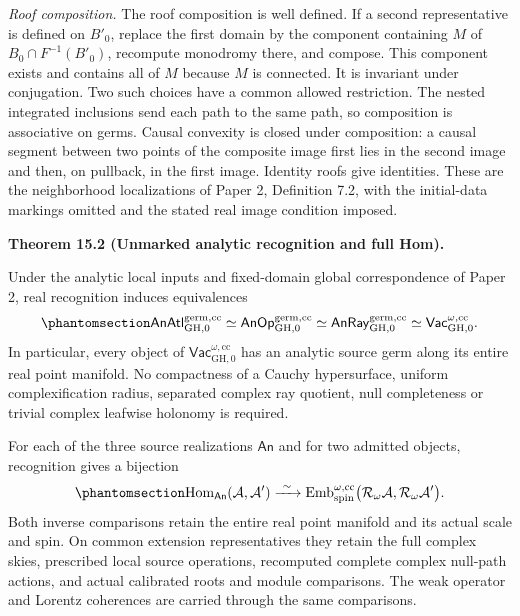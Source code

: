 \documentclass[
  english,
  11pt,
  reqno]{amsart}
\makeatletter
\newcommand{\pandocstatementheading}[1]{%
  \par\addpenalty{\@beginparpenalty}%
  \addvspace{.5\baselineskip plus .2\baselineskip minus .2\baselineskip}%
  {\normalfont\bfseries #1\par}%
  \nobreak\@afterindenttrue\@afterheading
}
\makeatother
\begin{document}
\emph{Roof composition.} The roof composition is well defined. If a
second representative is defined on \(B'_0\), replace the first domain
by the component containing \(M\) of \(B_0\cap F^{-1}(B'_0)\), recompute
monodromy there, and compose. This component exists and contains all of
\(M\) because \(M\) is connected. It is invariant under conjugation. Two
such choices have a common allowed restriction. The nested integrated
inclusions send each path to the same path, so composition is
associative on germs. Causal convexity is closed under composition: a
causal segment between two points of the composite image first lies in
the second image and then, on pullback, in the first image. Identity
roofs give identities. These are the neighborhood localizations of Paper
2, Definition 7.2, with the initial-data markings omitted and the stated
real image condition imposed.

\pandocstatementheading{\protect{}\label{thm:unmarked-global-analytic-recognition}Theorem 15.2 (Unmarked analytic recognition and full Hom).}

Under the analytic local inputs and fixed-domain global correspondence
of Paper 2, real recognition induces equivalences
\begin{equation}\protect\phantomsection\label{eq:unmarked-global-analytic-recognition}{
\mathsf{AnAtl}^{\mathrm{germ},\mathrm{cc}}_{\mathrm{GH},0}
\simeq
\mathsf{AnOp}^{\mathrm{germ},\mathrm{cc}}_{\mathrm{GH},0}
\simeq
\mathsf{AnRay}^{\mathrm{germ},\mathrm{cc}}_{\mathrm{GH},0}
\simeq
\mathsf{Vac}^{\omega,\mathrm{cc}}_{\mathrm{GH},0}.
}\end{equation} In particular, every object of
\(\mathsf{Vac}^{\omega,\mathrm{cc}}_{\mathrm{GH},0}\) has an analytic
source germ along its entire real point manifold. No compactness of a
Cauchy hypersurface, uniform complexification radius, separated complex
ray quotient, null completeness or trivial complex leafwise holonomy is
required.

For each of the three source realizations \(\mathsf{An}\) and for two
admitted objects, recognition gives a bijection
\begin{equation}\protect\phantomsection\label{eq:unmarked-global-analytic-full-hom}{
\operatorname{Hom}_{\mathsf{An}}(\mathcal A,\mathcal A')
\xrightarrow{\ \sim\ }
\operatorname{Emb}^{\omega,\mathrm{cc}}_{\mathrm{spin}}
\bigl(\mathcal R_\omega\mathcal A,
      \mathcal R_\omega\mathcal A'\bigr).
}\end{equation} Both inverse comparisons retain the entire real point
manifold and its actual scale and spin. On common extension
representatives they retain the full complex skies, prescribed local
source operations, recomputed complete complex null-path actions, and
actual calibrated roots and module comparisons. The weak operator and
Lorentz coherences are carried through the same comparisons.
\end{document}
